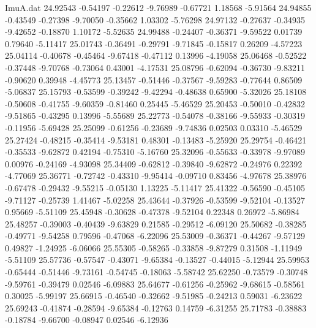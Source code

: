 \begin{filecontents}{ImuA.dat}
  24.92543   -0.54197   -0.22612   -9.76989   -0.67721    1.18568   -5.91564
  24.94855   -0.43549   -0.27398   -9.70050   -0.35662    1.03302   -5.76298
  24.97132   -0.27637   -0.34935   -9.42652   -0.18870    1.10172   -5.52635
  24.99488   -0.24407   -0.36371   -9.59522    0.01739    0.79640   -5.11417
  25.01743   -0.36491   -0.29791   -9.71845   -0.15817    0.26209   -4.57223
  25.04114   -0.40678   -0.45464   -9.67418   -0.47112    0.13996   -4.19058
  25.06468   -0.52522   -0.37448   -9.70768   -0.73064    0.43001   -4.17531
  25.08796   -0.62094   -0.36730   -9.83211   -0.90620    0.39948   -4.45773
  25.13457   -0.51446   -0.37567   -9.59283   -0.77644    0.86509   -5.06837
  25.15793   -0.53599   -0.39242   -9.42294   -0.48638    0.65900   -5.32026
  25.18108   -0.50608   -0.41755   -9.60359   -0.81460    0.25445   -5.46529
  25.20453   -0.50010   -0.42832   -9.51865   -0.43295    0.13996   -5.55689
  25.22773   -0.54078   -0.38166   -9.55933   -0.30319   -0.11956   -5.69428
  25.25099   -0.61256   -0.23689   -9.74836    0.02503    0.03310   -5.46529
  25.27424   -0.48215   -0.35414   -9.53181    0.48301   -0.13483   -5.25920
  25.29754   -0.46421   -0.35533   -9.62872    0.42194   -0.75310   -5.16760
  25.32096   -0.55633   -0.33978   -9.97089    0.00976   -0.24169   -4.93098
  25.34409   -0.62812   -0.39840   -9.62872   -0.24976    0.22392   -4.77069
  25.36771   -0.72742   -0.43310   -9.95414   -0.09710    0.83456   -4.97678
  25.38976   -0.67478   -0.29432   -9.55215   -0.05130    1.13225   -5.11417
  25.41322   -0.56590   -0.45105   -9.71127   -0.25739    1.41467   -5.02258
  25.43644   -0.37926   -0.53599   -9.52104   -0.13527    0.95669   -5.51109
  25.45948   -0.30628   -0.47378   -9.52104    0.22348    0.26972   -5.86984
  25.48257   -0.39003   -0.40439   -9.63829    0.21585   -0.29512   -6.09120
  25.50682   -0.38285   -0.49771   -9.54258    0.79596   -0.47068   -6.22096
  25.53009   -0.36371   -0.44267   -9.57129    0.49827   -1.24925   -6.06066
  25.55305   -0.58265   -0.33858   -9.87279    0.31508   -1.11949   -5.51109
  25.57736   -0.57547   -0.43071   -9.65384   -0.13527   -0.44015   -5.12944
  25.59953   -0.65444   -0.51446   -9.73161   -0.54745   -0.18063   -5.58742
  25.62250   -0.73579   -0.30748   -9.59761   -0.39479    0.02546   -6.09883
  25.64677   -0.61256   -0.25962   -9.68615   -0.58561    0.30025   -5.99197
  25.66915   -0.46540   -0.32662   -9.51985   -0.24213    0.59031   -6.23622
  25.69243   -0.41874   -0.28594   -9.65384   -0.12763    0.14759   -6.31255
  25.71783   -0.38883   -0.18784   -9.66700   -0.08947    0.02546   -6.12936

\end{filecontents}
